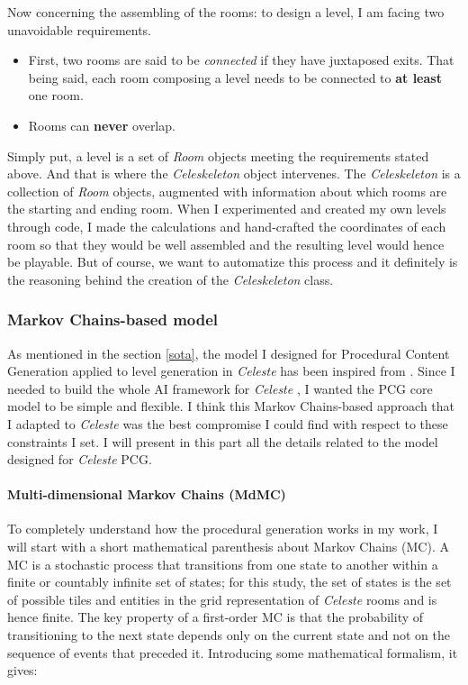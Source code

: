 \documentclass{article}
\newcommand{\Celeste}{\textit{Celeste} }
\begin{document}
\noindent Now concerning the assembling of the rooms: to design a level, I am facing two unavoidable requirements.
\begin{itemize}
    \item First, two rooms are said to be \textit{connected} if they have juxtaposed exits. That being said, each room composing a level needs to be connected to \textbf{at least} one room.
    \item Rooms can \textbf{never} overlap.
\end{itemize}
Simply put, a level is a set of \textit{Room} objects meeting the requirements stated above. And that is where the \textit{Celeskeleton} object intervenes. The \textit{Celeskeleton} is a collection of \textit{Room} objects, augmented with information about which rooms are the starting and ending room. When I experimented and created my own levels through code, I made the calculations and hand-crafted the coordinates of each room so that they would be well assembled and the resulting level would hence be playable. But of course, we want to automatize this process and it definitely is the reasoning behind the creation of the \textit{Celeskeleton} class. 

\subsubsection{Markov Chains-based model} \label{mod:pcg}
As mentioned in the section \ref{sota}, the model I designed for Procedural Content Generation applied to level generation in \Celeste has been inspired from \cite{MC}. Since I needed to build the whole AI framework for \Celeste, I wanted the PCG core model to be simple and flexible. I think this Markov Chains-based approach that I adapted to \Celeste was the best compromise I could find with respect to these constraints I set. I will present in this part all the details related to the model designed for \Celeste PCG.

\paragraph{Multi-dimensional Markov Chains (MdMC)} To completely understand how the procedural generation works in my work, I will start with a short mathematical parenthesis about Markov Chains (MC). A MC is a stochastic process that transitions from one state to another within a finite or countably infinite set of states; for this study, the set of states is the set of possible tiles and entities in the grid representation of \Celeste rooms and is hence finite. The key property of a first-order MC is that the probability of transitioning to the next state depends only on the current state and not on the sequence of events that preceded it. Introducing some mathematical formalism, it gives:
\end{document}

